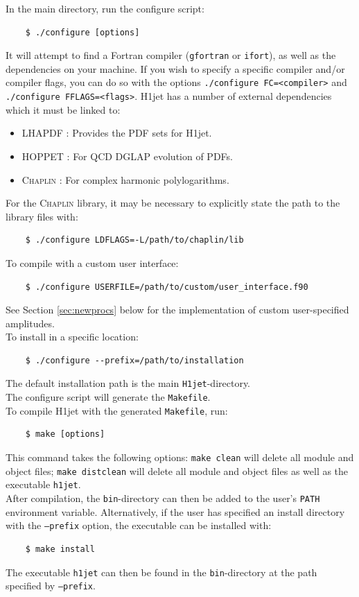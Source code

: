 \documentclass[12pt,a4wide]{article}
\begin{document}
In the main directory, run the configure script: 
\begin{lstlisting}
	$ ./configure [options] 
\end{lstlisting}
It will attempt to find a Fortran compiler (\texttt{gfortran} or \texttt{ifort}), as well as the dependencies on your machine. If you wish to specify a specific compiler and/or compiler flags, you can do so with the options \texttt{./configure FC=<compiler>} and \texttt{./configure FFLAGS=<flags>}. H1jet has a number of external dependencies which it must be linked to: 
\begin{itemize}
	\item LHAPDF \cite{bib:lhapdf}: Provides the PDF sets for H1jet. 
	\item \textsc{HOPPET} \cite{bib:hoppet}: For QCD DGLAP evolution of PDFs. 
	\item \textsc{Chaplin} \cite{bib:chaplin}: For complex harmonic polylogarithms. 
\end{itemize} 
For the \textsc{Chaplin} library, it may be necessary to explicitly state the path to the library files with:
\begin{lstlisting}
	$ ./configure LDFLAGS=-L/path/to/chaplin/lib 
\end{lstlisting}
To compile with a custom user interface: 
\begin{lstlisting}
	$ ./configure USERFILE=/path/to/custom/user_interface.f90  
\end{lstlisting}
See Section \ref{sec:newprocs} below for the implementation of custom user-specified amplitudes. \\ 
To install in a specific location: 
\begin{lstlisting}
	$ ./configure --prefix=/path/to/installation 
\end{lstlisting}
The default installation path is the main \texttt{H1jet}-directory. \\ 
The configure script will generate the \texttt{Makefile}. \\ 
To compile H1jet with the generated \texttt{Makefile}, run: 
\begin{lstlisting}
	$ make [options] 
\end{lstlisting}
This command takes the following options: \texttt{make clean} will delete all module and object files; \texttt{make distclean} will delete all module and object files as well as the executable \texttt{h1jet}. \\ 

After compilation, the \texttt{bin}-directory can then be added to the user's \texttt{PATH} environment variable. Alternatively, if the user has specified an install directory with the \texttt{--prefix} option, the executable can be installed with: 
\begin{lstlisting}
	$ make install  
\end{lstlisting}
The executable \texttt{h1jet} can then be found in the \texttt{bin}-directory at the path specified by \texttt{--prefix}. 
\end{document}
